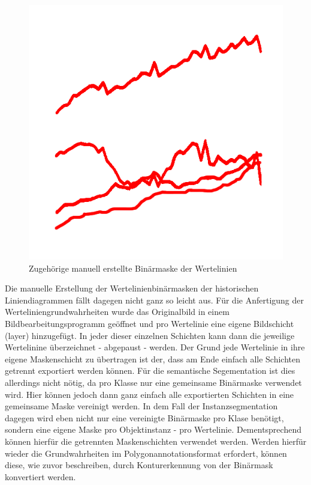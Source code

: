 \begin{figure}[h!]
\begin{minipage}{0.475\textwidth}
        \includegraphics[width=\linewidth]{Methodik/img/lines_historical_mask.png}
        \caption{ Zugehörige manuell erstellte Binärmaske der Wertelinien}
        \label{fig:lines_historical_mask}
    \end{minipage}
\end{figure}

Die manuelle Erstellung der Wertelinienbinärmasken der historischen Liniendiagrammen fällt dagegen nicht ganz so leicht aus. Für die Anfertigung der Werteliniengrundwahrheiten wurde das Originalbild in einem Bildbearbeitungsprogramm \cite{photopea} geöffnet und pro Wertelinie eine eigene Bildschicht (layer) hinzugefügt. In jeder dieser einzelnen Schichten kann dann die jeweilige Wertelinine überzeichnet - abgepaust - werden. Der Grund jede Wertelinie in ihre eigene Maskenschicht zu übertragen ist der, dass am Ende einfach alle Schichten getrennt exportiert werden können. Für die semantische Segementation ist dies allerdings nicht nötig, da pro Klasse nur eine gemeinsame Binärmaske verwendet wird. Hier können jedoch dann ganz einfach alle exportierten Schichten in eine gemeinsame Maske vereinigt werden. In dem Fall der Instanzsegmentation dagegen wird eben nicht nur eine vereinigte Binärmaske pro Klase benötigt, sondern eine eigene Maske pro Objektinstanz - pro Wertelinie. Dementsprechend können hierfür die getrennten Maskenschichten verwendet werden. Werden hierfür wieder die Grundwahrheiten im Polygonannotationsformat erfordert, können diese, wie zuvor beschreiben, durch Konturerkennung von der Binärmask konvertiert werden.